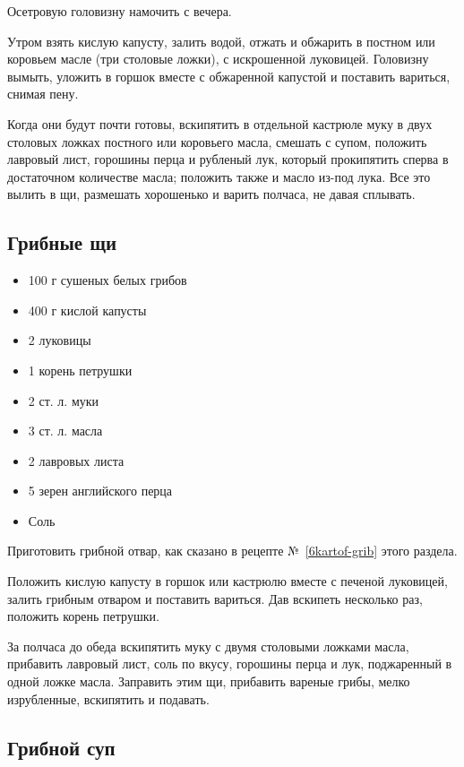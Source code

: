 Осетровую головизну намочить с вечера.

Утром взять кислую капусту, залить водой, отжать и обжарить в постном или коровьем масле (три столовые ложки), с искрошенной луковицей. Головизну вымыть, уложить в горшок вместе с обжаренной капустой и поставить вариться, снимая пену.

Когда они будут почти готовы, вскипятить в отдельной кастрюле муку в двух столовых ложках постного или коровьего масла, смешать с супом, положить лавровый лист, горошины перца и рубленый лук, который прокипятить сперва в достаточном количестве масла; положить также и масло из-под лука. Все это вылить в щи, размешать хорошенько и варить полчаса, не давая сплывать.

\subsection{Грибные щи}\label{15grib-schi}

\begin{itemize} 
	\item 100 г сушеных белых грибов
    \item 400 г кислой капусты
    \item 2 луковицы 
    \item 1 корень петрушки 
    \item 2 ст. л. муки 
    \item 3 ст. л. масла 
    \item 2 лавровых листа
    \item 5 зерен английского перца
    \item Соль
\end{itemize}

Приготовить грибной отвар, как сказано в рецепте №~\ref{6kartof-grib} этого раздела.

Положить кислую капусту в горшок или кастрюлю вместе с печеной луковицей, залить грибным отваром и поставить вариться. Дав вскипеть несколько раз, положить корень петрушки.

За полчаса до обеда вскипятить муку с двумя столовыми ложками масла, прибавить лавровый лист, соль по вкусу, горошины перца и лук, поджаренный в одной ложке масла. Заправить этим щи, прибавить вареные грибы, мелко изрубленные, вскипятить и подавать.

\subsection{Грибной суп}\label{16grib-sup}

